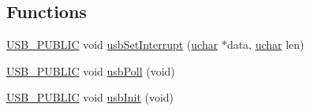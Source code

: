 \subsection*{Functions}
\begin{DoxyCompactItemize}
\item 
\hyperlink{mhvlib-_vusb-_console_2vusb_2usbdrv_8h_a5f6aa87267678dc37dd5d97a7b3df7c3}{U\-S\-B\-\_\-\-P\-U\-B\-L\-I\-C} void \hyperlink{mhvlib-_vusb-_console_2vusb_2usbdrv_8c_aafa474a799eed02d362bfdfb8a36602c}{usb\-Set\-Interrupt} (\hyperlink{mhvlib-_vusb-_console_2vusb_2usbdrv_8h_aa8ddf20cdd716b652e76e23e5e700893}{uchar} $\ast$data, \hyperlink{mhvlib-_vusb-_console_2vusb_2usbdrv_8h_aa8ddf20cdd716b652e76e23e5e700893}{uchar} len)
\item 
\hyperlink{mhvlib-_vusb-_console_2vusb_2usbdrv_8h_a5f6aa87267678dc37dd5d97a7b3df7c3}{U\-S\-B\-\_\-\-P\-U\-B\-L\-I\-C} void \hyperlink{mhvlib-_vusb-_console_2vusb_2usbdrv_8c_a188162c29eb62ffbd2d33763d20e12b4}{usb\-Poll} (void)
\item 
\hyperlink{mhvlib-_vusb-_console_2vusb_2usbdrv_8h_a5f6aa87267678dc37dd5d97a7b3df7c3}{U\-S\-B\-\_\-\-P\-U\-B\-L\-I\-C} void \hyperlink{mhvlib-_vusb-_console_2vusb_2usbdrv_8c_a5672a0c07f0f8e93bde4579d278e6307}{usb\-Init} (void)
\end{DoxyCompactItemize}
